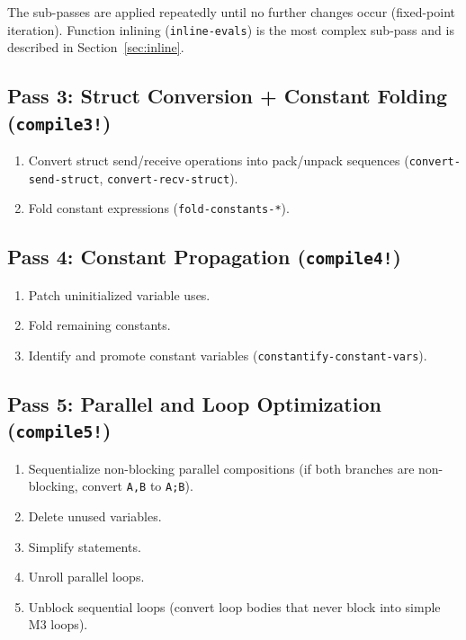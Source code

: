 \documentclass[11pt,letterpaper]{article}
\begin{document}
The sub-passes are applied repeatedly until no further changes occur
(fixed-point iteration).  Function inlining (\texttt{inline-evals})
is the most complex sub-pass and is described in
Section~\ref{sec:inline}.

\subsection{Pass 3: Struct Conversion + Constant Folding (\texttt{compile3!})}

\begin{enumerate}[nosep]
  \item Convert struct send/receive operations into pack/unpack
    sequences (\texttt{convert-send-struct}, \texttt{convert-recv-struct}).
  \item Fold constant expressions (\texttt{fold-constants-*}).
\end{enumerate}

\subsection{Pass 4: Constant Propagation (\texttt{compile4!})}

\begin{enumerate}[nosep]
  \item Patch uninitialized variable uses.
  \item Fold remaining constants.
  \item Identify and promote constant variables
    (\texttt{constantify-constant-vars}).
\end{enumerate}

\subsection{Pass 5: Parallel and Loop Optimization (\texttt{compile5!})}

\begin{enumerate}[nosep]
  \item Sequentialize non-blocking parallel compositions (if both
    branches are non-blocking, convert \texttt{A,B} to \texttt{A;B}).
  \item Delete unused variables.
  \item Simplify statements.
  \item Unroll parallel loops.
  \item Unblock sequential loops (convert loop bodies that never
    block into simple M3 loops).
\end{enumerate}
\end{document}
